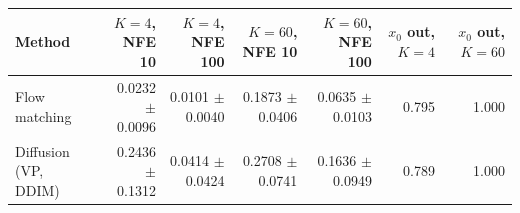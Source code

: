 \begin{tabular}{lrrrrrr}
\toprule
Method & $K{=}4$, NFE 10 & $K{=}4$, NFE 100 & $K{=}60$, NFE 10 & $K{=}60$, NFE 100 & $x_0$ out, $K{=}4$ & $x_0$ out, $K{=}60$ \\
\midrule
Flow matching & 0.0232 $\pm$ 0.0096 & 0.0101 $\pm$ 0.0040 & 0.1873 $\pm$ 0.0406 & 0.0635 $\pm$ 0.0103 & 0.795 & 1.000 \\
Diffusion (VP, DDIM) & 0.2436 $\pm$ 0.1312 & 0.0414 $\pm$ 0.0424 & 0.2708 $\pm$ 0.0741 & 0.1636 $\pm$ 0.0949 & 0.789 & 1.000 \\
\bottomrule
\end{tabular}